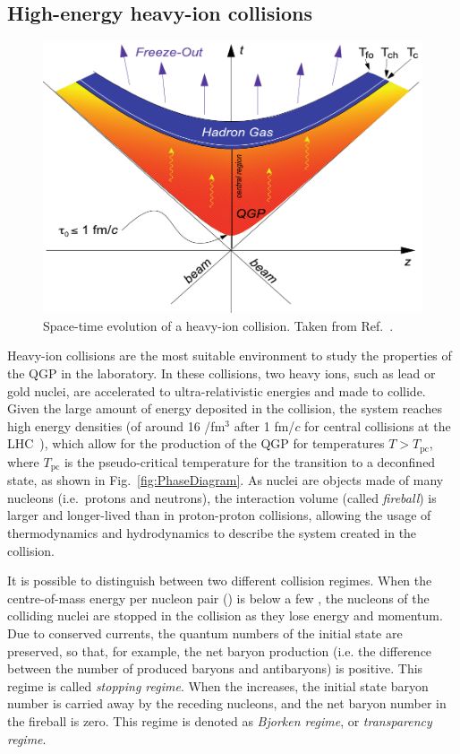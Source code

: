 \subsection{High-energy heavy-ion collisions}
\begin{figure}[t]
  \centering
  \includegraphics[width=0.7\linewidth]{Figures/Chapter 1/Bild_18.pdf}
  \caption{Space-time evolution of a heavy-ion collision. Taken from Ref.~\cite{Stock:2008ru}.}
  \label{fig:HeavyIonCollisions}
\end{figure}
Heavy-ion collisions are the most suitable environment to study the properties of the QGP in the laboratory. In these collisions, two heavy ions, such as lead or gold nuclei, are accelerated to ultra-relativistic energies and made to collide. Given the large amount of energy deposited in the collision, the system reaches high energy densities (of around 16 \gev/fm$^3$ after 1 fm/$c$ for central collisions at the LHC~\cite{Loizides:2011ys}), which allow for the production of the QGP for temperatures $T>T_\mathrm{pc}$, where $T_\mathrm{pc}$ is the pseudo-critical temperature for the transition to a deconfined state, as shown in Fig.~\ref{fig:PhaseDiagram}. As nuclei are objects made of many nucleons (i.e.\ protons and neutrons), the interaction volume (called \emph{fireball}) is larger and longer-lived than in proton-proton collisions, allowing the usage of thermodynamics and hydrodynamics to describe the system created in the collision. 

It is possible to distinguish between two different collision regimes. When the centre-of-mass energy per nucleon pair (\snn) is below a few \gev, the nucleons of the colliding nuclei are stopped in the collision as they lose energy and momentum. Due to conserved currents, the quantum numbers of the initial state are preserved, so that, for example, the net baryon production (i.e. the difference between the number of produced baryons and antibaryons) is positive. This regime is called \emph{stopping regime}. When the \snn increases, the initial state baryon number is carried away by the receding nucleons, and the net baryon number in the fireball is zero. This regime is denoted as \emph{Bjorken regime}, or \emph{transparency regime}. 

